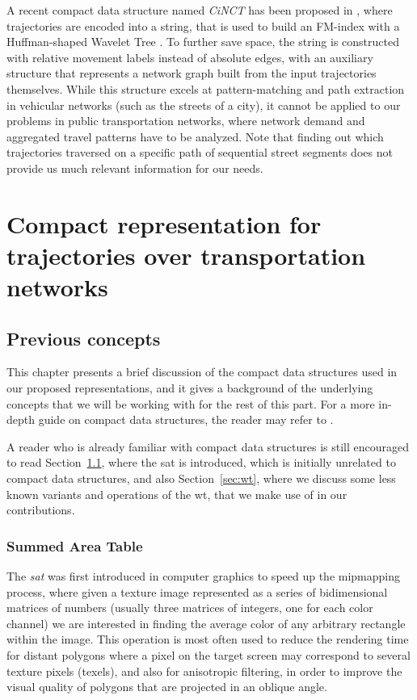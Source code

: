 \documentclass[a4paper,10pt,twoside]{book}
\begin{document}
    
    A recent compact data structure named {\em CiNCT} has been proposed in \cite{koide2018cinct}, where trajectories are encoded into a string, that is used to build an FM-index \cite{DBLP:conf/focs/FerraginaM00} with a Huffman-shaped Wavelet Tree \cite{ferragina2009compressed}. To further save space, the string is constructed with relative movement labels instead of absolute edges, with an auxiliary structure that represents a network graph built from the input trajectories themselves. While this structure excels at pattern-matching and path extraction in vehicular networks (such as the streets of a city), it cannot be applied to our problems in public transportation networks, where network demand and aggregated travel patterns have to be analyzed. Note that finding out which trajectories traversed on a specific path of sequential street segments does not provide us much relevant information for our needs.
	
	
\part{Compact representation for trajectories over transportation networks} \label{part:cds}
\chapter{Previous concepts}
\label{ch:cds:prev}
	This chapter presents a brief discussion of the compact data structures used in our proposed representations, and it gives a background of the underlying concepts that we will be working with for the rest of this part. For a more in-depth guide on compact data structures, the reader may refer to \cite{Nav16}.
	
	A reader who is already familiar with compact data structures is still encouraged to read Section~\ref{sec:sat}, where the \gls{sat} is introduced, which is initially unrelated to compact data structures, and also Section~\ref{sec:wt}, where we discuss some less known variants and operations of the \gls{wt}, that we make use of in our contributions.
	
	\section{Summed Area Table}
	\label{sec:sat}
	The {\em \acrfull{sat}} was first introduced in computer graphics \cite{crow1984summed} to speed up the mipmapping process, where given a texture image represented as a series of bidimensional matrices of numbers (usually three matrices of integers, one for each color channel) we are interested in finding the average color of any arbitrary rectangle within the image. This operation is most often used to reduce the rendering time for distant polygons where a pixel on the target screen may correspond to several texture pixels (texels), and also for anisotropic filtering, in order to improve the visual quality of polygons that are projected in an oblique angle.
\end{document}
